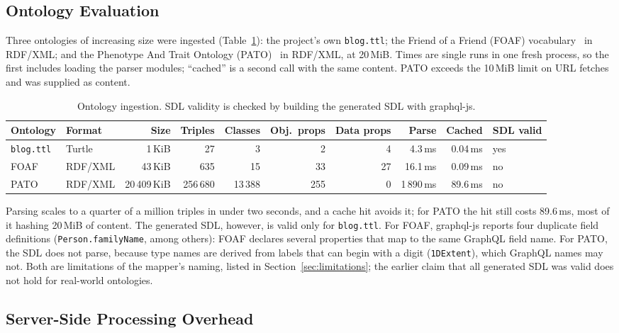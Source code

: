 \documentclass[sigconf,nonacm]{acmart}
\begin{document}
\subsection{Ontology Evaluation}

Three ontologies of increasing size were ingested
(Table~\ref{tab:ontology}): the project's own \texttt{blog.ttl}; the
Friend of a Friend (FOAF) vocabulary~\cite{foaf} in RDF/XML; and the
Phenotype And Trait Ontology (PATO)~\cite{pato} in RDF/XML, at 20\,MiB.
Times are single runs in one fresh process, so the first includes
loading the parser modules; ``cached'' is a second call with the same
content.  PATO exceeds the 10\,MiB limit on URL fetches and was
supplied as content.

\begin{table}[t]
\caption{Ontology ingestion.  SDL validity is checked by building the
  generated SDL with graphql-js.}
\label{tab:ontology}
\small
\begin{tabular}{llrrrrrrrl}
\toprule
Ontology & Format & Size & Triples & Classes & Obj.\ props & Data props
         & Parse & Cached & SDL valid \\
\midrule
\texttt{blog.ttl} & Turtle  & 1\,KiB      & 27        & 3        & 2   & 4  & 4.3\,ms    & 0.04\,ms & yes \\
FOAF              & RDF/XML & 43\,KiB     & 635       & 15       & 33  & 27 & 16.1\,ms   & 0.09\,ms & no  \\
PATO              & RDF/XML & 20\,409\,KiB & 256\,680 & 13\,388  & 255 & 0  & 1\,890\,ms & 89.6\,ms & no  \\
\bottomrule
\end{tabular}
\end{table}

Parsing scales to a quarter of a million triples in under two seconds,
and a cache hit avoids it; for PATO the hit still costs 89.6\,ms, most
of it hashing 20\,MiB of content.  The generated SDL, however, is valid
only for \texttt{blog.ttl}.  For FOAF, graphql-js reports four
duplicate field definitions (\texttt{Person.familyName}, among others):
FOAF declares several properties that map to the same GraphQL field
name.  For PATO, the SDL does not parse, because type names are derived
from labels that can begin with a digit (\texttt{1DExtent}), which
GraphQL names may not.  Both are limitations of the mapper's naming,
listed in Section~\ref{sec:limitations}; the earlier claim that all
generated SDL was valid does not hold for real-world ontologies.

\subsection{Server-Side Processing Overhead}
\end{document}
